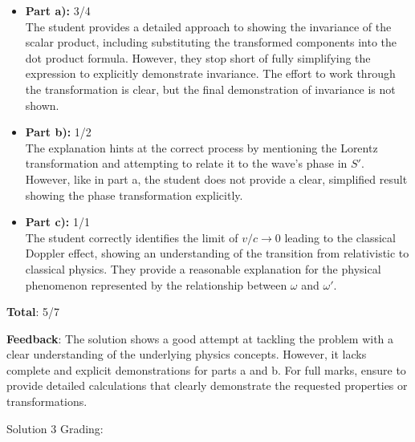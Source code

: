 \documentclass[a4paper,11pt]{article}
\begin{document}
\begin{itemize}
    \item \textbf{Part a):} 3/4 \\
    The student provides a detailed approach to showing the invariance of the scalar product, including substituting the transformed components into the dot product formula. However, they stop short of fully simplifying the expression to explicitly demonstrate invariance. The effort to work through the transformation is clear, but the final demonstration of invariance is not shown.
    
    \item \textbf{Part b):} 1/2 \\
    The explanation hints at the correct process by mentioning the Lorentz transformation and attempting to relate it to the wave's phase in \( S' \). However, like in part a, the student does not provide a clear, simplified result showing the phase transformation explicitly.
    
    \item \textbf{Part c):} 1/1 \\
    The student correctly identifies the limit of \( v/c \rightarrow 0 \) leading to the classical Doppler effect, showing an understanding of the transition from relativistic to classical physics. They provide a reasonable explanation for the physical phenomenon represented by the relationship between \( \omega \) and \( \omega' \).
\end{itemize}

\textbf{Total}: 5/7

\textbf{Feedback}: The solution shows a good attempt at tackling the problem with a clear understanding of the underlying physics concepts. However, it lacks complete and explicit demonstrations for parts a and b. For full marks, ensure to provide detailed calculations that clearly demonstrate the requested properties or transformations.

Solution 3 Grading:
\end{document}
